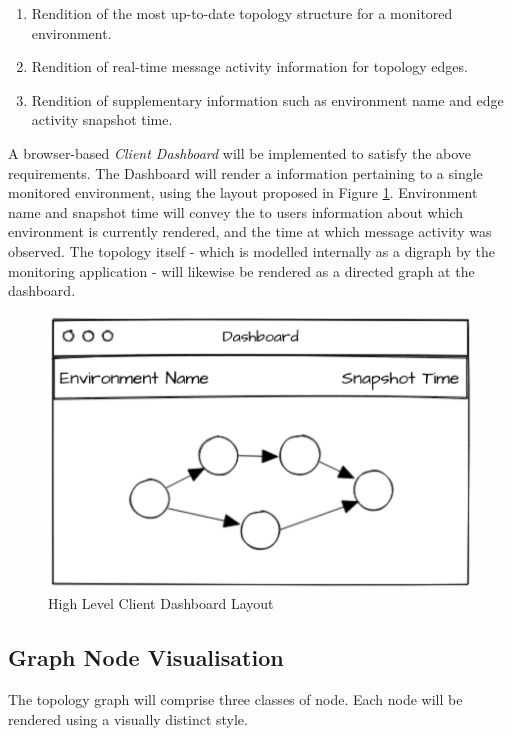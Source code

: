 \begin{enumerate}
	\item Rendition of the most up-to-date topology structure for a monitored environment.
	\item Rendition of real-time message activity information for topology edges.
	\item Rendition of supplementary information such as environment name and edge activity snapshot time.
\end{enumerate}

A browser-based \textit{Client Dashboard} will be implemented to satisfy the above requirements. The Dashboard will render a information pertaining to a single monitored environment, using the layout proposed in Figure \ref{dashboard_high_level}. Environment name and snapshot time will convey the to users information about which environment is currently rendered, and the time at which message activity was observed. The topology itself - which is modelled internally as a digraph by the monitoring application - will likewise be rendered as a directed graph at the dashboard.

\begin{figure}[H]
	\centering  
	\includegraphics[scale=0.8]{figures/design/viz_high_level.png}
	\caption{High Level Client Dashboard Layout}
	\label{dashboard_high_level}
\end{figure}

\subsection{Graph Node Visualisation}\label{design_client_dashboard}

The topology graph will comprise three classes of node. Each node will be rendered using a visually distinct style.


